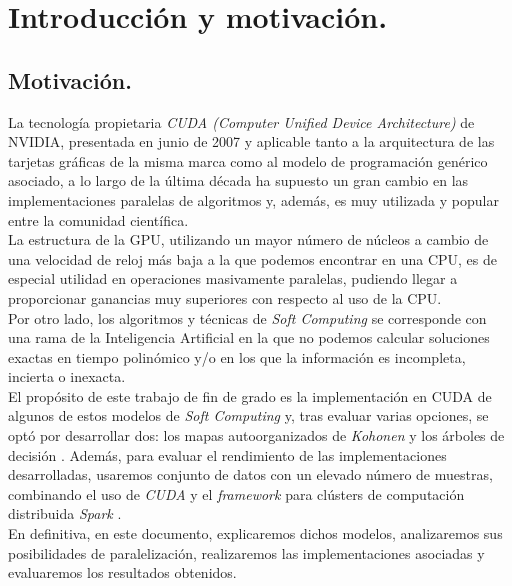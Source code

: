 \documentclass[a4paper,11pt]{book}
\begin{document}

  
\frontmatter
\tableofcontents
\listoffigures
\listoftables

%
\mainmatter
\setlength{\parskip}{5pt}
\chapter{Introducción y motivación.}
\section{Motivación.}
La tecnología propietaria \textit{CUDA (Computer Unified Device Architecture)} \cite{cuda} de NVIDIA, presentada en junio de 2007 y aplicable tanto a la arquitectura de las tarjetas gráficas de la misma marca como al modelo de programación genérico asociado, a lo largo de la última década ha supuesto un gran cambio en las implementaciones paralelas de algoritmos y, además, es muy utilizada y popular entre la comunidad científica.\\

La estructura de la GPU, utilizando un mayor número de núcleos a cambio de una velocidad de reloj más baja a la que podemos encontrar en una CPU, es de especial utilidad en operaciones masivamente paralelas, pudiendo llegar a proporcionar ganancias muy superiores con respecto al uso de la CPU.\\

Por otro lado, los algoritmos y técnicas de \textit{Soft Computing} se corresponde con una rama de la Inteligencia Artificial en la que no podemos calcular soluciones exactas en tiempo polinómico y/o en los que la información es incompleta, incierta o inexacta.\\

El propósito de este trabajo de fin de grado es la implementación en CUDA de algunos de estos modelos de \textit{Soft Computing} y, tras evaluar varias opciones, se optó por desarrollar dos: los mapas autoorganizados de \textit{Kohonen} \cite{kohonensom} y los árboles de decisión \cite{arbol}. Además, para evaluar el rendimiento de las implementaciones desarrolladas, usaremos conjunto de datos con un elevado número de muestras, combinando el uso de \textit{CUDA} y el \textit{framework} para clústers de computación distribuida \textit{Spark} \cite{spark}.\\

En definitiva, en este documento, explicaremos dichos modelos, analizaremos sus posibilidades de paralelización, realizaremos las implementaciones asociadas y evaluaremos los resultados obtenidos.
\end{document}
